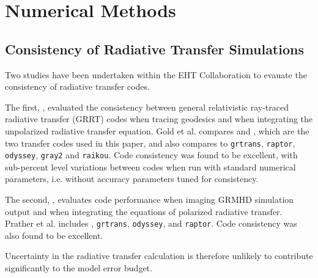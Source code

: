 \section{Numerical Methods}\label{app:numerical}

\subsection{Consistency of Radiative Transfer Simulations}\label{app:radtrans}


Two studies have been undertaken within the EHT Collaboration to evauate the consistency of radiative transfer codes. 

The first, \citep{2020ApJ...897..148G}, evaluated the consistency between general relativistic ray-traced radiative transfer (GRRT) codes when tracing geodesics and when integrating the unpolarized radiative transfer equation.  Gold et al. compares \bhoss and \ipole, which are the two transfer codes used in this paper, and  also compares to {\tt grtrans}, {\tt raptor}, {\tt odyssey}, {\tt gray2} and {\tt raikou}.  Code consistency was found to be excellent, with sub-percent level variations between codes when run with standard numerical parameters, i.e. without accuracy parameters tuned for consistency.

The second, \citet{Prather_et_al_2022}, evaluates code performance when imaging GRMHD simulation output and when integrating the equations of polarized radiative transfer.  Prather et al. includes \ipole, {\tt grtrans}, {\tt odyssey}, and {\tt raptor}.  Code consistency was also found to be excellent.  

Uncertainty in the radiative transfer calculation is therefore  unlikely to contribute significantly to the model error budget.  

